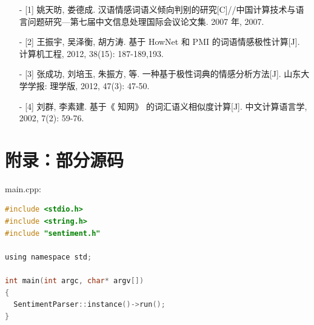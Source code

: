 \documentclass[11pt,a4paper]{article}
\begin{document}
\begin{itemize}
\item[-] [1] 姚天昉, 娄德成. 汉语情感词语义倾向判别的研究[C]//中国计算技术与语言问题研究—第七届中文信息处理国际会议论文集. 2007 年, 2007.
\item[-] [2] 王振宇, 吴泽衡, 胡方涛. 基于 HowNet 和 PMI 的词语情感极性计算[J]. 计算机工程, 2012, 38(15): 187-189,193.
\item[-] [3] 张成功, 刘培玉, 朱振方, 等. 一种基于极性词典的情感分析方法[J]. 山东大学学报: 理学版, 2012, 47(3): 47-50.
\item[-] [4] 刘群, 李素建. 基于《 知网》 的词汇语义相似度计算[J]. 中文计算语言学, 2002, 7(2): 59-76.
\end{itemize}

\section{附录：部分源码}


main.cpp:

{\scriptsize\begin{lstlisting}[language=C]
#include <stdio.h>
#include <string.h>
#include "sentiment.h"

using namespace std;

int main(int argc, char* argv[])
{
  SentimentParser::instance()->run();
}
\end{lstlisting}}
\end{document}
